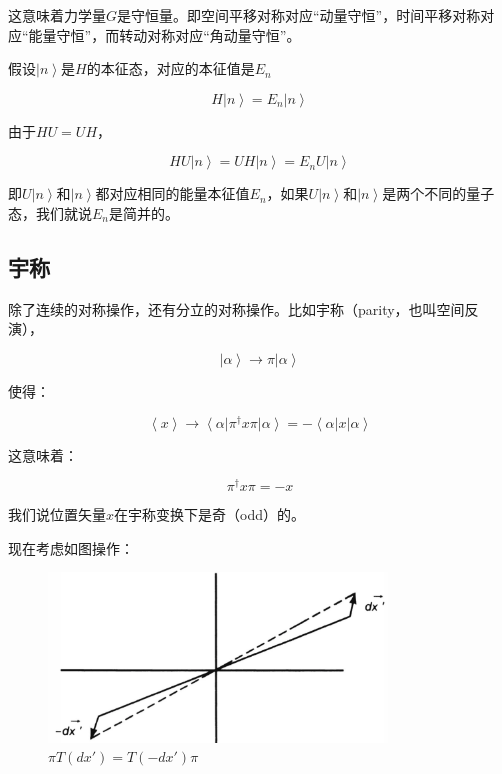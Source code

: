 这意味着力学量$G$是守恒量。即空间平移对称对应“动量守恒”，时间平移对称对应“能量守恒”，而转动对称对应“角动量守恒”。

假设$\left| n \right\rangle$是$H$的本征态，对应的本征值是$E_n$

\begin{equation}
H \left| n \right\rangle = E_n \left| n \right\rangle
\end{equation}

由于$ HU = UH$，

\begin{equation}
H U \left| n \right\rangle = U H \left| n \right\rangle = E_n U \left| n \right\rangle 
\end{equation}

即$U \left| n \right\rangle $和$\left| n \right\rangle$都对应相同的能量本征值$E_n$，如果$U \left| n \right\rangle $和$\left| n \right\rangle$是两个不同的量子态，我们就说$E_n$是简并的。

\subsection{宇称}

除了连续的对称操作，还有分立的对称操作。比如宇称（parity，也叫空间反演），

\begin{equation}
\left| \alpha \right\rangle \to \pi \left| \alpha \right\rangle
\end{equation}

使得：

\begin{equation}
\left\langle x \right\rangle \to  \left\langle \alpha \right| \pi^\dagger x \pi \left| \alpha \right\rangle   =  - \left\langle  \alpha \right|  x \left| \alpha \right\rangle 
\end{equation}

这意味着：

\begin{equation}
\pi^\dagger x \pi = - x 
\end{equation}

我们说位置矢量$x$在宇称变换下是奇（odd）的。

现在考虑如图操作：

\begin{figure}[htbp]
\begin{center}
\includegraphics[width=9cm]{Symmetry/piTTpi.png}
\caption{$\pi T(dx') = T(- dx') \pi$}
\end{center}
\end{figure}

